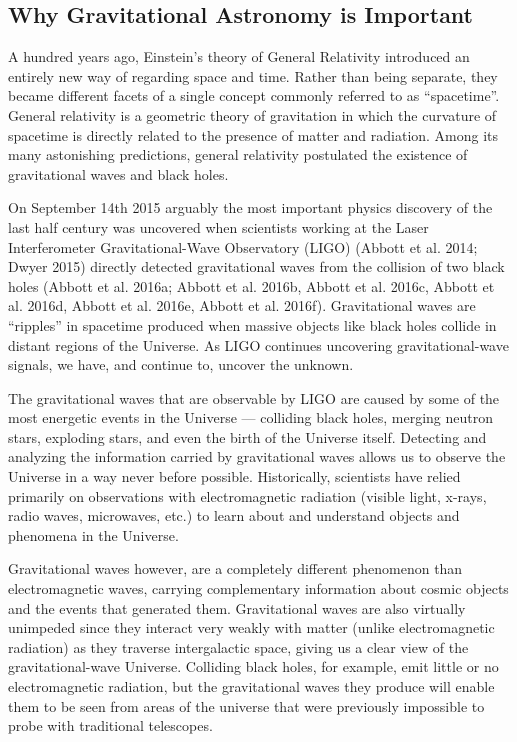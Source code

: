 \documentclass[11.5pt]{sig-alternate} %
\begin{document}
\begin{large}
\subsection*{Why Gravitational Astronomy is Important}

A hundred years ago, Einstein's theory of General Relativity introduced an entirely new way of regarding space and time.  Rather than being separate, they became different facets of a single concept commonly referred to as “spacetime”.  General relativity is a geometric theory of gravitation in which the curvature of spacetime is directly related to the presence of matter and radiation.  Among its many astonishing predictions, general relativity postulated the existence of gravitational waves and black holes. 

On September 14th 2015 arguably the most important physics discovery of the last half century was uncovered when scientists working at the Laser Interferometer Gravitational-Wave Observatory (LIGO) (Abbott et al. 2014; Dwyer 2015) directly detected gravitational waves from the collision of two black holes (Abbott et al. 2016a; Abbott et al. 2016b, Abbott et al. 2016c, Abbott et al. 2016d, Abbott et al. 2016e, Abbott et al. 2016f).  Gravitational waves are “ripples” in spacetime produced when massive objects like black holes collide in distant regions of the Universe. As LIGO continues uncovering gravitational-wave signals, we have, and continue to, uncover the unknown.

The gravitational waves that are observable by LIGO are caused by some of the most energetic events in the Universe — colliding black holes, merging neutron stars, exploding stars, and even the birth of the Universe itself. Detecting and analyzing the information carried by gravitational waves allows us to observe the Universe in a way never before possible.  Historically, scientists have relied primarily on observations with electromagnetic radiation (visible light, x-rays, radio waves, microwaves, etc.) to learn about and understand objects and phenomena in the Universe.  

Gravitational waves however, are a completely different phenomenon than electromagnetic waves, carrying complementary information about cosmic objects and the events that generated them.  Gravitational waves are also virtually unimpeded since they interact very weakly with matter (unlike electromagnetic radiation) as they traverse intergalactic space, giving us a clear view of the gravitational-wave Universe.  Colliding black holes, for example, emit little or no electromagnetic radiation, but the gravitational waves they produce will enable them to be seen from areas of the universe that were previously impossible to probe with traditional telescopes. 


\end{large}
\end{document}
